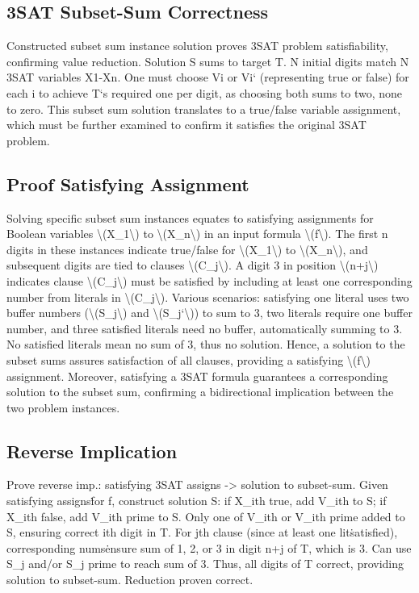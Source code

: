 \subsection*{3SAT Subset-Sum  Correctness}
Constructed subset sum instance solution proves 3SAT problem satisfiability, confirming value reduction.
Solution S sums to target T\@.
N initial digits match N 3SAT variables X1-Xn.
One must choose Vi or Vi` (representing true or false) for each i to achieve T`s required one per digit, as choosing both sums to two, none to zero.
This subset sum solution translates to a true/false variable assignment, which must be further examined to confirm it satisfies the original 3SAT problem.

\subsection*{Proof  Satisfying Assignment}
Solving specific subset sum instances equates to satisfying assignments for Boolean variables \textbackslash{}(X\_1\textbackslash{}) to \textbackslash{}(X\_n\textbackslash{}) in an input formula \textbackslash{}(f\textbackslash{}).
The first n digits in these instances indicate true/false for \textbackslash{}(X\_1\textbackslash{}) to \textbackslash{}(X\_n\textbackslash{}), and subsequent digits are tied to clauses \textbackslash{}(C\_j\textbackslash{}).
A digit 3 in position \textbackslash{}(n+j\textbackslash{}) indicates clause \textbackslash{}(C\_j\textbackslash{}) must be satisfied by including at least one corresponding number from literals in \textbackslash{}(C\_j\textbackslash{}).
Various scenarios: satisfying one literal uses two buffer numbers (\textbackslash{}(S\_j\textbackslash{}) and \textbackslash{}(S\_j`\textbackslash{})) to sum to 3, two literals require one buffer number, and three satisfied literals need no buffer, automatically summing to 3.
No satisfied literals mean no sum of 3, thus no solution.
Hence, a solution to the subset sums assures satisfaction of all clauses, providing a satisfying \textbackslash{}(f\textbackslash{}) assignment.
Moreover, satisfying a 3SAT formula guarantees a corresponding solution to the subset sum, confirming a bidirectional implication between the two problem instances.

\subsection*{Reverse Implication}
Prove reverse imp.: satisfying 3SAT assigns -\textgreater{} solution to subset-sum.
Given satisfying assigns\. for f, construct solution S: if X\_ith true, add V\_ith to S; if X\_ith false, add V\_ith prime to S\@.
Only one of V\_ith or V\_ith prime added to S, ensuring correct ith digit in T\@.
For jth clause (since at least one lit\. satisfied), corresponding nums\. ensure sum of 1, 2, or 3 in digit n+j of T, which is 3.
Can use S\_j and/or S\_j prime to reach sum of 3.
Thus, all digits of T correct, providing solution to subset-sum.
Reduction proven correct.

